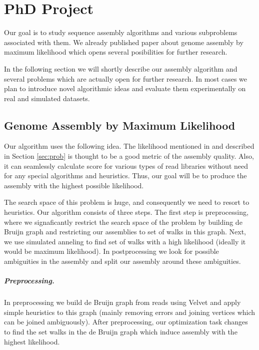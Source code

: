 \chapter{PhD Project}

Our goal is to study sequence assembly algorithms and
various subproblems associated with them.
We already published paper about genome assembly by maximum likelihood \citep{GAML}
which opens several posibilities for further research.

In the following section we will shortly describe our assembly algorithm
and several problems which are actually open for further research.
In most cases we plan to introduce novel algorithmic ideas
and evaluate them experimentally on real and simulated datasets.

\section{Genome Assembly by Maximum Likelihood}

Our algorithm uses the following idea.
The likelihood  mentioned in \cite{Ghodsi2013} and described in Section \ref{sec:prob} 
is thought to be a good metric of the assembly quality.
Also, it can seamlessly calculate score for various types of read libraries without need
for any special algorithms and heuristics. 
Thus, our goal will be to produce the assembly with the highest possible likelihood.

The search space of this problem is huge, and consequently 
we need to resort to heuristics.
Our algorithm consists of three steps.
The first step is preprocessing, where we signaficantly restrict the search
space of the problem
by building de Bruijn graph and restricting our assemblies to set of walks
in this graph. Next, we use simulated anneling to find set of walks
with a high likelihood (ideally it would be maximum likelihood).
In postprocessing we look for possible
ambiguities in the assembly and split our assembly around these ambiguities.

\paragraph{Preprocessing.} In preprocessing we build de Bruijn graph from reads
using Velvet \citep{Velvet} and apply simple heuristics to this graph
 (mainly removing errors and joining vertices which can be joined ambiguously).
After preprocessing, our optimization task changes to find the set walks
in the de Bruijn graph which induce assembly with the highest likelihood.

